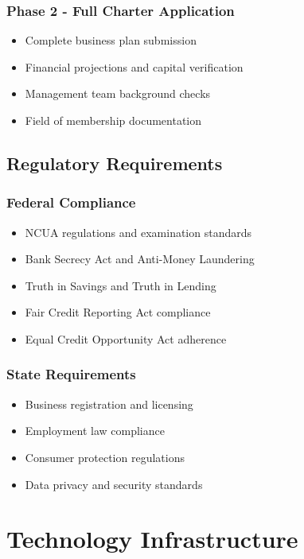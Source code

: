\documentclass[11pt,letterpaper]{article}
\begin{document}
\subsubsection{Phase 2 - Full Charter Application}
\begin{itemize}[leftmargin=*]
    \item Complete business plan submission
    \item Financial projections and capital verification
    \item Management team background checks
    \item Field of membership documentation
\end{itemize}

\subsection{Regulatory Requirements}

\subsubsection{Federal Compliance}
\begin{itemize}[leftmargin=*]
    \item NCUA regulations and examination standards
    \item Bank Secrecy Act and Anti-Money Laundering
    \item Truth in Savings and Truth in Lending
    \item Fair Credit Reporting Act compliance
    \item Equal Credit Opportunity Act adherence
\end{itemize}

\subsubsection{State Requirements}
\begin{itemize}[leftmargin=*]
    \item Business registration and licensing
    \item Employment law compliance
    \item Consumer protection regulations
    \item Data privacy and security standards
\end{itemize}

\section{Technology Infrastructure}
\end{document}
